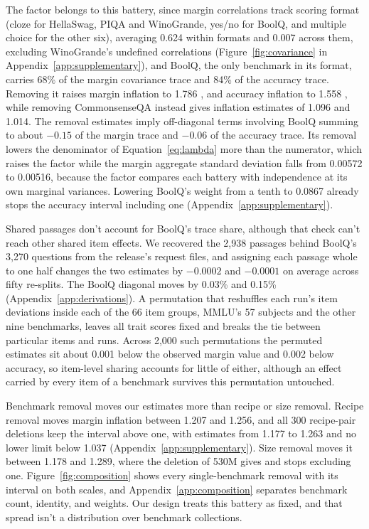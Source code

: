 The factor belongs to this battery, since margin correlations track scoring format (cloze for HellaSwag, PIQA and WinoGrande, yes/no for BoolQ, and multiple choice for the other six), averaging 0.624 within formats and 0.007 across them, excluding WinoGrande's undefined correlations (Figure~\ref{fig:covariance} in Appendix~\ref{app:supplementary}), and BoolQ, the only benchmark in its format, carries 68\% of the margin covariance trace and 84\% of the accuracy trace. Removing it raises margin inflation to 1.786 , and accuracy inflation to 1.558 , while removing CommonsenseQA instead gives inflation estimates of 1.096 and 1.014. The removal estimates imply off-diagonal terms involving BoolQ summing to about $-0.15$ of the margin trace and $-0.06$ of the accuracy trace. Its removal lowers the denominator of Equation~\ref{eq:lambda} more than the numerator, which raises the factor while the margin aggregate standard deviation falls from 0.00572 to 0.00516, because the factor compares each battery with independence at its own marginal variances. Lowering BoolQ's weight from a tenth to 0.0867 already stops the accuracy interval including one (Appendix~\ref{app:supplementary}).

Shared passages don't account for BoolQ's trace share, although that check can't reach other shared item effects. We recovered the 2,938 passages behind BoolQ's 3,270 questions from the release's request files, and assigning each passage whole to one half changes the two estimates by $-0.0002$ and $-0.0001$ on average across fifty re-splits. The BoolQ diagonal moves by 0.03\% and 0.15\% (Appendix~\ref{app:derivations}). A permutation that reshuffles each run's item deviations inside each of the 66 item groups, MMLU's 57 subjects and the other nine benchmarks, leaves all trait scores fixed and breaks the tie between particular items and runs. Across 2,000 such permutations the permuted estimates sit about 0.001 below the observed margin value and 0.002 below accuracy, so item-level sharing accounts for little of either, although an effect carried by every item of a benchmark survives this permutation untouched.

Benchmark removal moves our estimates more than recipe or size removal. Recipe removal moves margin inflation between 1.207 and 1.256, and all 300 recipe-pair deletions keep the interval above one, with estimates from 1.177 to 1.263 and no lower limit below 1.037 (Appendix~\ref{app:supplementary}). Size removal moves it between 1.178 and 1.289, where the deletion of 530M gives  and stops excluding one. Figure~\ref{fig:composition} shows every single-benchmark removal with its interval on both scales, and Appendix~\ref{app:composition} separates benchmark count, identity, and weights. Our design treats this battery as fixed, and that spread isn't a distribution over benchmark collections.

